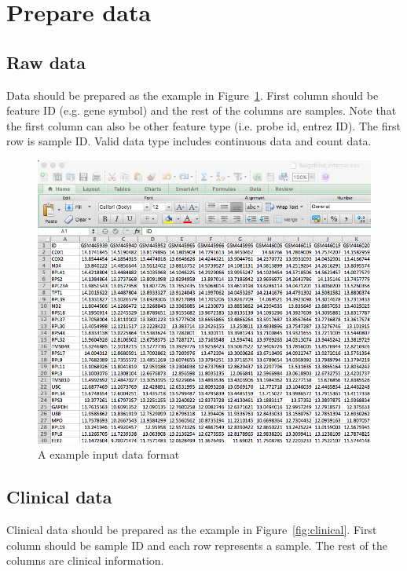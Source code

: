 
\section{Prepare data}
\label{sec:dataPrepare}
\subsection{Raw data}

Data should be prepared as the example in Figure~\ref{fig:dataMicroarray}.
First column should be feature ID (e.g. gene symbol) and the rest of the columns are samples.
Note that the first column can also be other feature type (i.e. probe id, entrez ID).
The first row is sample ID.
Valid data type includes continuous data and count data.

\begin{figure}[H]
\begin{center}
\includegraphics[scale=0.5]{./figure/dataPreparation/dataMicroarray}
\caption{A example input data format}
\label{fig:dataMicroarray}
\end{center}
\end{figure}

\subsection{Clinical data}

Clinical data should be prepared as the example in Figure~\ref{fig:clinical}.
First column should be sample ID and each row represents a sample.
The rest of the columns are clinical information.

